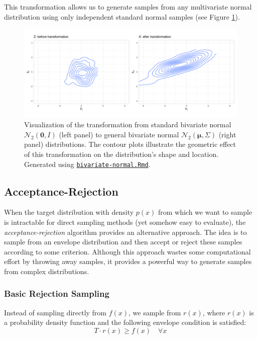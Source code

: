 This transformation allows us to generate samples from any multivariate normal distribution using only independent standard normal samples (see Figure \ref{fig:multivariate_normal}).

\begin{figure}[h]
    \centering
    \includegraphics[width=.8\linewidth]{figures/bivariate.png}
    \caption{Visualization of the transformation from standard bivariate normal $\mathcal{N}_2(\boldsymbol{0}, I)$ (left panel) to general bivariate normal $\mathcal{N}_2(\boldsymbol{\mu}, \Sigma)$ (right panel) distributions. The contour plots illustrate the geometric effect of this transformation on the distribution's shape and location. Generated using \href{https://github.com/NikoGerman/Seminar/blob/main/Notebooks/bivariate-normal.Rmd}{\texttt{bivariate-normal.Rmd}}.}
    \label{fig:multivariate_normal}
\end{figure}

\subsection{Acceptance-Rejection}
\label{rejection_sampling}

When the target distribution with density $p(x)$ from which we want to sample is intractable for direct sampling methods (yet somehow easy to evaluate), the \textit{acceptance-rejection} algorithm provides an alternative approach. The idea is to sample from an envelope distribution and then accept or reject these samples according to some criterion. Although this approach wastes some computational effort by throwing away samples, it provides a powerful way to generate samples from complex distributions.

\subsubsection{Basic Rejection Sampling}
Instead of sampling directly from $f(x)$, we sample from $r(x)$, where $r(x)$ is a probability density function and the following envelope condition is satisfied:
\begin{equation*}
    T \cdot r(x) \geq f(x) \quad \forall x
\end{equation*}

